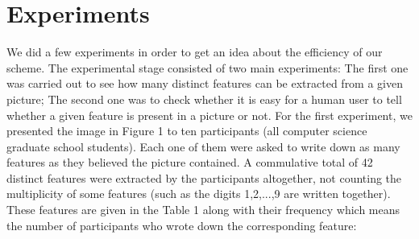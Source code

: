 \documentclass{llncs}
\begin{document}
\section{Experiments}
We did a few experiments in order to get an idea about the efficiency of our scheme. The experimental stage consisted of two main experiments: The first one was carried out to see how many distinct features can be extracted from a given picture; The second one was to check whether it is easy for a human user to tell whether a given feature is present in a picture or not. For the first experiment, we presented the image in Figure 1 to ten participants (all computer science graduate school students). Each one of them were asked to write down as many features as they believed the picture contained. A commulative total of 42 distinct features were extracted by the participants altogether, not counting the multiplicity of some features (such as the digits 1,2,...,9 are written together). These features are given in the Table 1 along with their frequency which means the number of participants who wrote down the corresponding feature:\\
\end{document}
